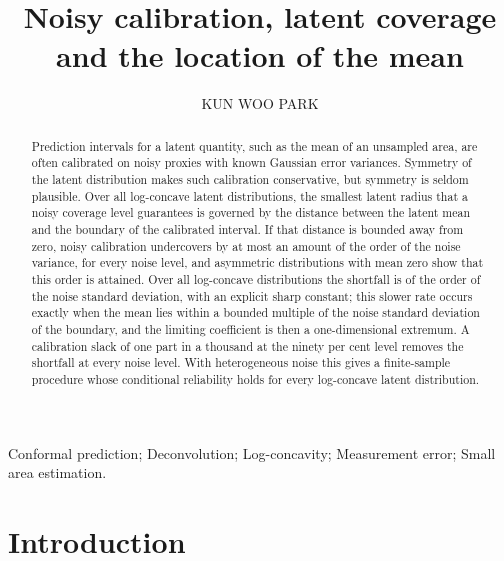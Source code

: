 \documentclass[lineno]{biometrika}
\begin{document}
\jvol{}
\jnum{}
\accessdate{}


\title{Noisy calibration, latent coverage and the location of the mean}

\author{KUN WOO PARK}

\maketitle

\begin{abstract}
Prediction intervals for a latent quantity, such as the mean of an unsampled area, are often calibrated on noisy proxies with known Gaussian error variances. Symmetry of the latent distribution makes such calibration conservative, but symmetry is seldom plausible. Over all log-concave latent distributions, the smallest latent radius that a noisy coverage level guarantees is governed by the distance between the latent mean and the boundary of the calibrated interval. If that distance is bounded away from zero, noisy calibration undercovers by at most an amount of the order of the noise variance, for every noise level, and asymmetric distributions with mean zero show that this order is attained. Over all log-concave distributions the shortfall is of the order of the noise standard deviation, with an explicit sharp constant; this slower rate occurs exactly when the mean lies within a bounded multiple of the noise standard deviation of the boundary, and the limiting coefficient is then a one-dimensional extremum. A calibration slack of one part in a thousand at the ninety per cent level removes the shortfall at every noise level. With heterogeneous noise this gives a finite-sample procedure whose conditional reliability holds for every log-concave latent distribution.
\end{abstract}

\begin{keywords}
Conformal prediction; Deconvolution; Log-concavity; Measurement error; Small area estimation.
\end{keywords}

\section{Introduction}\label{sec:intro}
\end{document}
